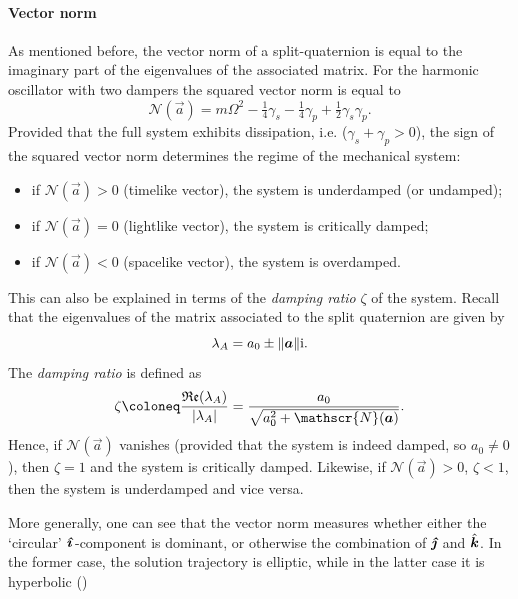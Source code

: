 \paragraph{Vector norm}
As mentioned before, the vector norm of a split-quaternion is equal to the imaginary part of the eigenvalues of the associated matrix. For the harmonic oscillator with two dampers the squared vector norm is equal to 
\begin{equation}
     \mathscr{N}(\vec{a}) = m\Omega^2 - \tfrac{1}{4}\gamma_s - \tfrac{1}{4}\gamma_p + \tfrac{1}{2}\gamma_s \gamma_p.
\end{equation}
Provided that the full system exhibits dissipation, i.e. (\(\gamma_s + \gamma_p > 0\)), the sign of the squared vector norm determines the regime of the mechanical system:
\begin{itemize}
    \item if \(\mathscr{N}(\vec{a}) > 0\) (timelike vector), the system is underdamped (or undamped); 
    \item if \(\mathscr{N}(\vec{a}) = 0\) (lightlike vector), the system is critically damped; 
    \item if \(\mathscr{N}(\vec{a}) < 0\) (spacelike vector), the system is overdamped.
\end{itemize}
This can also be explained in terms of the \emph{damping ratio} \(\zeta\) of the system. Recall that the eigenvalues of the matrix associated to the split quaternion are given by
\begin{equation}
    \lambda_A = a_0 \pm \norm{\vec{a}}\ii.
\end{equation}
The \emph{damping ratio} is defined as
\begin{equation}
    \zeta \coloneq \frac{\Re(\lambda_A)}{\abs{\lambda_A}} = \frac{a_0}{\sqrt{a_0^2 + \mathscr{N}(\vec{a})}}.
\end{equation}
Hence, if \(\mathscr{N}(\vec{a})\) vanishes (provided that the system is indeed damped, so \(a_0 \neq 0\)), then \(\zeta = 1\) and the system is critically damped. Likewise, if \(\mathscr{N}(\vec{a}) > 0\), \(\zeta < 1\), then the system is underdamped and vice versa.

More generally, one can see that the vector norm measures whether either the `circular' \(\quati\)-component is dominant, or otherwise the combination of \(\quatj\) and \(\quatk\). In the former case, the solution trajectory is elliptic, while in the latter case it is hyperbolic ()

